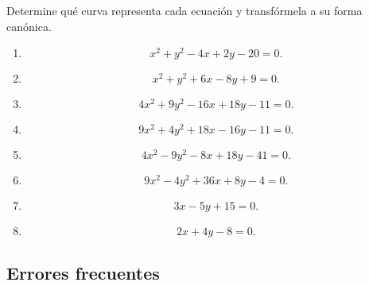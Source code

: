 \documentclass[12pt]{article}
\begin{document}
Determine qué curva representa cada ecuación y transfórmela a su forma
canónica.

\begin{enumerate}

\item
\[
x^2+y^2-4x+2y-20=0.
\]

\item
\[
x^2+y^2+6x-8y+9=0.
\]

\item
\[
4x^2+9y^2-16x+18y-11=0.
\]

\item
\[
9x^2+4y^2+18x-16y-11=0.
\]

\item
\[
4x^2-9y^2-8x+18y-41=0.
\]

\item
\[
9x^2-4y^2+36x+8y-4=0.
\]

\item
\[
3x-5y+15=0.
\]

\item
\[
2x+4y-8=0.
\]

\end{enumerate}

\subsection*{Errores frecuentes}
\end{document}
